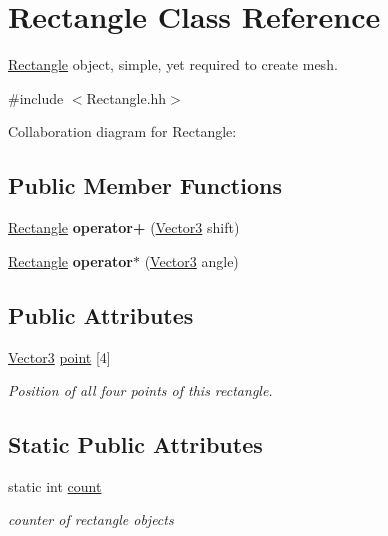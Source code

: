 \hypertarget{class_rectangle}{}\section{Rectangle Class Reference}
\label{class_rectangle}


\hyperlink{class_rectangle}{Rectangle} object, simple, yet required to create mesh.  




{\ttfamily \#include $<$Rectangle.\+hh$>$}



Collaboration diagram for Rectangle\+:
\subsection*{Public Member Functions}
\begin{DoxyCompactItemize}
\item 
\mbox{\label{class_rectangle_ac30d51b77d939e353a121f0c073e423e}} 
\hyperlink{class_rectangle}{Rectangle} {\bfseries operator+} (\hyperlink{class_vector}{Vector3} shift)
\item 
\mbox{\label{class_rectangle_af874d859273f782b98af019e6bed8c90}} 
\hyperlink{class_rectangle}{Rectangle} {\bfseries operator$\ast$} (\hyperlink{class_vector}{Vector3} angle)
\end{DoxyCompactItemize}
\subsection*{Public Attributes}
\begin{DoxyCompactItemize}
\item 
\mbox{\label{class_rectangle_a8a5e5dfeb67edd7eca327421a54328a5}} 
\hyperlink{class_vector}{Vector3} \hyperlink{class_rectangle_a8a5e5dfeb67edd7eca327421a54328a5}{point} \mbox{[}4\mbox{]}
\begin{DoxyCompactList}\small\item\em Position of all four points of this rectangle. \end{DoxyCompactList}\end{DoxyCompactItemize}
\subsection*{Static Public Attributes}
\begin{DoxyCompactItemize}
\item 
\mbox{\label{class_rectangle_a738339f1d6761ec3a6b91d81b2a27ce6}} 
static int \hyperlink{class_rectangle_a738339f1d6761ec3a6b91d81b2a27ce6}{count}
\begin{DoxyCompactList}\small\item\em counter of rectangle objects \end{DoxyCompactList}\end{DoxyCompactItemize}


